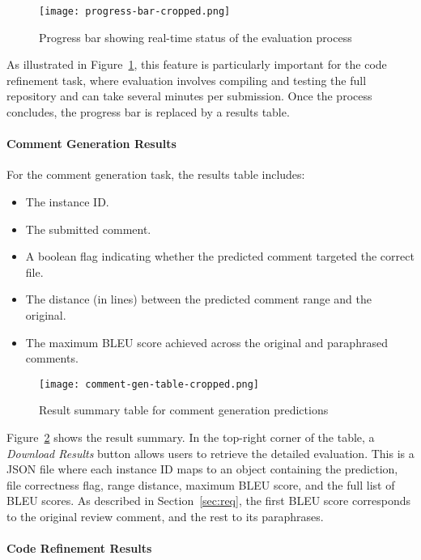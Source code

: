 \begin{figure}[H]
	\centering
	\texttt{[image: progress-bar-cropped.png]}
	\caption{Progress bar showing real-time status of the evaluation process}
	\label{fig:progress-bar}
\end{figure}


As illustrated in Figure~\ref{fig:progress-bar}, this feature is particularly important for the code
refinement task, where evaluation involves compiling and testing the full repository and can take
several minutes per submission. Once the process concludes, the progress bar is replaced by a
results table.

\paragraph{Comment Generation Results}

For the comment generation task, the results table includes:
\begin{itemize}
	\item The instance ID.
	\item The submitted comment.
	\item A boolean flag indicating whether the predicted comment targeted the correct file.
	\item The distance (in lines) between the predicted comment range and the original.
	\item The maximum BLEU score achieved across the original and paraphrased comments.
\end{itemize}

\begin{figure}[H]
	\centering
	\texttt{[image: comment-gen-table-cropped.png]}
	\caption{Result summary table for comment generation predictions}
	\label{fig:comment-table}
\end{figure}

Figure~\ref{fig:comment-table} shows the result summary. In the top-right corner of the table, a
\textit{Download Results} button allows users to retrieve the detailed evaluation. This is a JSON
file where each instance ID maps to an object containing the prediction, file correctness flag,
range distance, maximum BLEU score, and the full list of BLEU scores. As described in
Section~\ref{sec:req}, the first BLEU score corresponds to the original review comment, and the rest
to its paraphrases.

\paragraph{Code Refinement Results}

